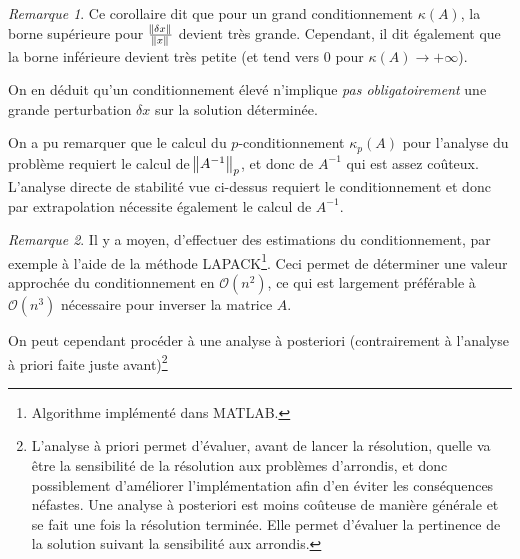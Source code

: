 \documentclass{article}
\theoremstyle{definition}
\theoremstyle{remark}
\newtheorem*{rmq}{Remarque}
\begin{document}
		\begin{rmq} Ce corollaire dit que pour un grand conditionnement $\kappa(A)$, la borne supérieure pour $\frac {\norm {\delta x}}{\norm x}$ devient très
		grande. Cependant, il dit également que la borne inférieure devient très petite (et tend vers 0 pour $\kappa(A) \to +\infty$).

		On en déduit qu'un conditionnement élevé n'implique \emph{pas obligatoirement} une grande perturbation $\delta x$ sur la solution déterminée.
		\end{rmq}

		On a pu remarquer que le calcul du $p$-conditionnement $\kappa_p(A)$ pour l'analyse du problème requiert le calcul de $\norm {A^{-1}}_p$, et donc de
		$A^{-1}$ qui est assez coûteux. L'analyse directe de stabilité vue ci-dessus requiert le conditionnement et donc par extrapolation nécessite également
		le calcul de $A^{-1}$. 

		\begin{rmq} Il y a moyen, d'effectuer des estimations du conditionnement, par exemple à l'aide de la méthode LAPACK\footnote{Algorithme implémenté dans
		MATLAB.}. Ceci permet de déterminer une valeur approchée du conditionnement en $\mathcal O(n^2)$, ce qui est largement préférable à $\mathcal O(n^3)$
		nécessaire pour inverser la matrice $A$.
		\end{rmq}

		On peut cependant procéder à une analyse à posteriori (contrairement à l'analyse à priori faite juste avant)\footnote{L'analyse à priori permet d'évaluer,
		avant de lancer la résolution, quelle va être la sensibilité de la résolution aux problèmes d'arrondis, et donc possiblement d'améliorer l'implémentation
		afin d'en éviter les conséquences néfastes. Une analyse à posteriori est moins coûteuse de manière générale et se fait une fois la résolution terminée.
		Elle permet d'évaluer la pertinence de la solution suivant la sensibilité aux arrondis.}
\end{document}
